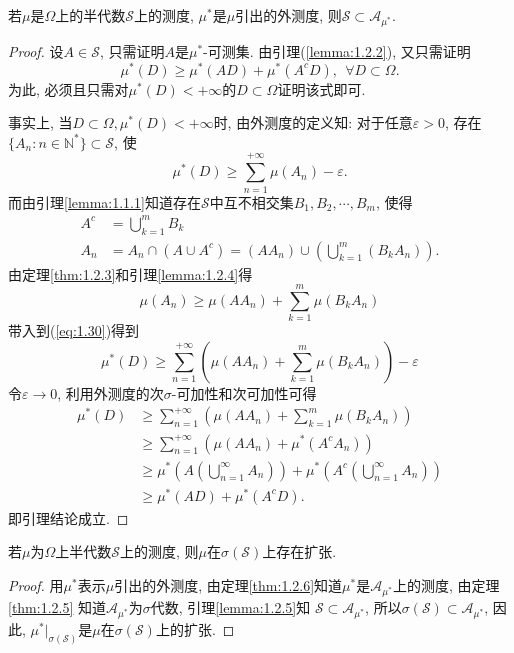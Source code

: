 \begin{lemma}
	若$\mu$是$\Omega$上的半代数$\mathscr{S}$上的测度, $\mu^*$是$\mu$引出的外测度, 则$\mathscr{S}\subset \mathscr{A}_{\mu^*}$.
\end{lemma}
\begin{proof}
	设$A\in\mathscr{S}$, 只需证明$A$是$\mu^*$-可测集. 由引理(\ref{lemma:1.2.2}), 又只需证明
	\begin{equation}
		\mu^*(D) \geqslant \mu^*(AD) + \mu^*(A^cD),~~\forall D\subset\Omega.
	\end{equation}
	为此, 必须且只需对$\mu^*(D)<+\infty$的$D\subset\Omega$证明该式即可.

	事实上, 当$D\subset\Omega,\mu^*(D)<+\infty$时, 由外测度的定义知: 对于任意$\varepsilon>0$, 存在$\{ A_n:n\in\mathbb{N}^* \}\subset\mathscr{S}$, 使
	\begin{equation}
		\mu^*(D)\geqslant \sum_{n=1}^{+\infty}\mu(A_n)- \varepsilon.
	\end{equation}
	而由引理\ref{lemma:1.1.1}知道存在$\mathscr{S}$中互不相交集$B_1, B_2,\cdots, B_m$, 使得
	\begin{align}
		A^c &= \bigcup_{k=1}^m B_k\nonumber\\
		A_n &= A_n\cap\left( A\cup A^c \right) = (AA_n)\cup \left( \bigcup_{k=1}^m (B_kA_n) \right).
	\end{align}
	由定理\ref{thm:1.2.3}和引理\ref{lemma:1.2.4}得
	\begin{equation}
		\mu(A_n)\geqslant \mu(AA_n)+\sum_{k=1}^m\mu(B_kA_n)
	\end{equation}
	带入到(\ref{eq:1.30})得到
	\begin{equation}
		\mu^*(D)\geqslant \sum_{n=1}^{+\infty}\left( \mu(AA_n)+\sum_{k=1}^m\mu(B_kA_n) \right)-\varepsilon
	\end{equation}
	令$\varepsilon\to 0$, 利用外测度的次$\sigma$-可加性和次可加性可得
	\begin{align}
		\mu^*(D)&\geqslant\sum_{n=1}^{+\infty}\left( \mu(AA_n)+\sum_{k=1}^m\mu(B_kA_n) \right)\nonumber\\
		&\geqslant \sum_{n=1}^{+\infty}\left( \mu(AA_n)+\mu^*(A^cA_n) \right)\nonumber\\
		&\geqslant \mu^*\left( A\left( \bigcup_{n=1}^{\infty}A_n \right) \right)+\mu^*\left( A^c\left( \bigcup_{n=1}^{\infty}A_n \right) \right)\nonumber\\
		&\geqslant \mu^*(AD) + \mu^*(A^cD).
	\end{align}
	即引理结论成立.
\end{proof}

\begin{theorem}
	若$\mu$为$\Omega$上半代数$\mathscr{S}$上的测度, 则$\mu$在$\sigma(\mathscr{S})$上存在扩张.
\end{theorem}
\begin{proof}
	用$\mu^*$表示$\mu$引出的外测度, 由定理\ref{thm:1.2.6}知道$\mu^*$是$\mathscr{A}_{\mu^*}$上的测度, 由定理\ref{thm:1.2.5}
	知道$\mathscr{A}_{\mu^*}$为$\sigma$代数, 引理\ref{lemma:1.2.5}知
	$\mathscr{S}\subset\mathscr{A}_{\mu^*}$, 所以$\sigma(\mathscr{S})\subset\mathscr{A}_{\mu^*}$, 因此,
	$\mu^*\bigg\vert_{\sigma(\mathscr{S})}$是$\mu$在$\sigma(\mathscr{S})$上的扩张.
\end{proof}


